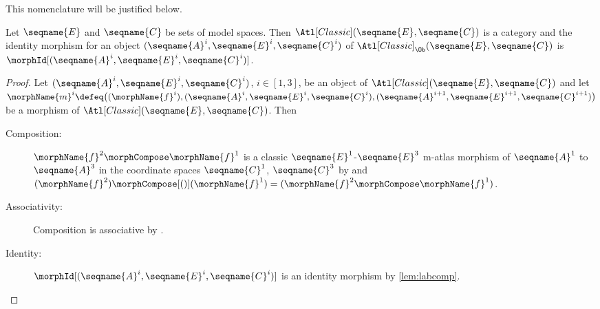 \documentclass{article}
\begin{document}
\begin{definition}
This nomenclature will be justified below.
\end{definition}

\begin{lemma}
\label{lem:M-ATLCiscat}
Let $\seqname{E}$ and $\seqname{C}$ be sets of model spaces. Then
$\Atl[Classic](\seqname{E}, \seqname{C})$ is a category and the identity
morphism for an object $(\seqname{A}^i, \seqname{E}^i, \seqname{C}^i)$
of $\Atl[Classic]_\Ob(\seqname{E}, \seqname{C})$ is
$\morphId[{{(\seqname{A}^i, \seqname{E}^i, \seqname{C}^i)}}]$.

\begin{proof}
Let $(\seqname{A}^i,\seqname{E}^i,\seqname{C}^i)$, $i \in [1,3]$,
be an object of $\Atl[Classic](\seqname{E}, \seqname{C})$ and
let \\
$
  \morphName{m}^i \defeq
  \bigl (
    (\morphName{f}^i),
    (\seqname{A}^i,\seqname{E}^i,\seqname{C}^i),
    (\seqname{A}^{i+1},\seqname{E}^{i+1},\seqname{C}^{i+1})
  \bigr )
$
be a morphism of $\Atl[Classic](\seqname{E}, \seqname{C})$. Then
\begin{description}
\item [Composition:]
$\morphName{f}^2 \morphCompose \morphName{f}^1$ is a classic
$\seqname{E}^1$-$\seqname{E}^3$ m-atlas morphism of $\seqname{A}^1$ to
$\seqname{A}^3$ in the coordinate spaces $\seqname{C}^1$,
$\seqname{C}^3$ by  and
$
  (\morphName{f}^2) \morphCompose[()] (\morphName{f}^1) =
  (\morphName{f}^2 \morphCompose \morphName{f}^1)
$.
\item [Associativity:]
Composition is associative by .
\item [Identity:]
$\morphId[{{(\seqname{A}^i, \seqname{E}^i, \seqname{C}^i)}}]$ is an identity
morphism by \cref{lem:labcomp}.
\end{description}
\end{proof}
\end{lemma}
\end{document}
